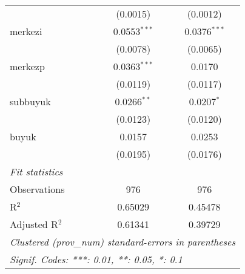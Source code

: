 \begin{table}[htbp]
\begin{tabular}{lcc}
                            & (0.0015)                & (0.0012)\\   
      merkezi               & 0.0553$^{***}$          & 0.0376$^{***}$\\   
                            & (0.0078)                & (0.0065)\\   
      merkezp               & 0.0363$^{***}$          & 0.0170\\   
                            & (0.0119)                & (0.0117)\\   
      subbuyuk              & 0.0266$^{**}$           & 0.0207$^{*}$\\   
                            & (0.0123)                & (0.0120)\\   
      buyuk                 & 0.0157                  & 0.0253\\   
                            & (0.0195)                & (0.0176)\\   
      \midrule
      \emph{Fit statistics}\\
      Observations          & 976                     & 976\\  
      R$^2$                 & 0.65029                 & 0.45478\\  
      Adjusted R$^2$        & 0.61341                 & 0.39729\\  
      \midrule \midrule
      \multicolumn{3}{l}{\emph{Clustered (prov\_num) standard-errors in parentheses}}\\
      \multicolumn{3}{l}{\emph{Signif. Codes: ***: 0.01, **: 0.05, *: 0.1}}\\
   \end{tabular}
\end{table}



